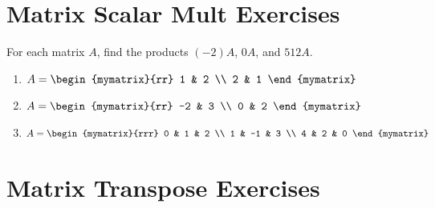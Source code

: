 \documentclass{ximera}
\begin{document}
\section*{Matrix Scalar Mult Exercises}

\begin{ex}
  For each matrix $A$, find the products $(-2)A$, $0A$, and $512A$.
  \begin{enumerate}
  \item
    $A = \begin{mymatrix}{rr}
      1 & 2 \\
      2 & 1
    \end{mymatrix}$
  \item
    $A = \begin{mymatrix}{rr}
      -2 & 3 \\
      0 & 2
    \end{mymatrix}$
  \item
    $A = \begin{mymatrix}{rrr}
      0 & 1 & 2 \\
      1 & -1 & 3 \\
      4 & 2 & 0
    \end{mymatrix}$
  \end{enumerate}
\end{ex}

\section*{Matrix Transpose Exercises}
\end{document}
